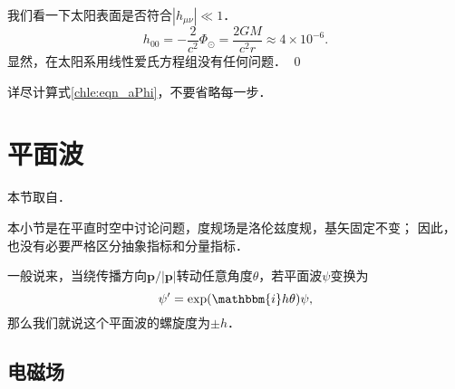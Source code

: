 \begin{example}
	我们看一下太阳表面是否符合$|h_{\mu\nu}|\ll 1$．
\begin{equation*}
	h_{00}=-\frac{2}{c^2}\Phi_{\odot}
	= \frac{ 2 G M }{c^2 r} \approx 4 \times 10^{-6} .
\end{equation*}
显然，在太阳系用线性爱氏方程组没有任何问题． \qed
\end{example}




\begin{exercise}
	详尽计算式\eqref{chle:eqn_aPhi}，不要省略每一步．
\end{exercise}











\section{平面波}

本节取自\parencite[\S 10.2]{weinberg_grav-1972}．

本小节是在平直时空中讨论问题，度规场是洛伦兹度规，基矢固定不变；
因此，也没有必要严格区分抽象指标和分量指标．


一般说来，当绕传播方向$\boldsymbol{p}/|\boldsymbol{p}|$转动任意角度$\theta$，若平面波$\psi$变换为
\begin{equation}\label{chle:eqn_helicity}
	\psi' =\exp(\mathbbm{i}h\theta) \psi,
\end{equation}
那么我们就说这个平面波的{\heiti 螺旋度}为$\pm h$．

\subsection{电磁场}


